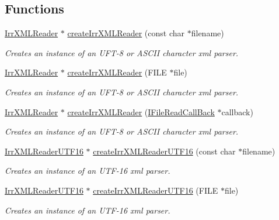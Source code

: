 \subsection*{Functions}
\begin{CompactItemize}
\item 
\hyperlink{classirr_1_1io_1_1_i_irr_x_m_l_reader}{IrrXMLReader} $\ast$ \hyperlink{namespaceirr_1_1io_a79dd5b9dae1b75be3dec4374176a5ce}{createIrrXMLReader} (const char $\ast$filename)
\begin{CompactList}\small\item\em Creates an instance of an UFT-8 or ASCII character xml parser. \item\end{CompactList}\item 
\hyperlink{classirr_1_1io_1_1_i_irr_x_m_l_reader}{IrrXMLReader} $\ast$ \hyperlink{namespaceirr_1_1io_64543772bdd123f8be1cdb20dac36353}{createIrrXMLReader} (FILE $\ast$file)
\begin{CompactList}\small\item\em Creates an instance of an UFT-8 or ASCII character xml parser. \item\end{CompactList}\item 
\hyperlink{classirr_1_1io_1_1_i_irr_x_m_l_reader}{IrrXMLReader} $\ast$ \hyperlink{namespaceirr_1_1io_70866610843a6fc753681de9a9076f4d}{createIrrXMLReader} (\hyperlink{classirr_1_1io_1_1_i_file_read_call_back}{IFileReadCallBack} $\ast$callback)
\begin{CompactList}\small\item\em Creates an instance of an UFT-8 or ASCII character xml parser. \item\end{CompactList}\item 
\hyperlink{classirr_1_1io_1_1_i_irr_x_m_l_reader}{IrrXMLReaderUTF16} $\ast$ \hyperlink{namespaceirr_1_1io_41c9d4c0d94702b3da2dca5799384443}{createIrrXMLReaderUTF16} (const char $\ast$filename)
\begin{CompactList}\small\item\em Creates an instance of an UTF-16 xml parser. \item\end{CompactList}\item 
\hyperlink{classirr_1_1io_1_1_i_irr_x_m_l_reader}{IrrXMLReaderUTF16} $\ast$ \hyperlink{namespaceirr_1_1io_4cc6190dd7eab54b7bff7219c550627f}{createIrrXMLReaderUTF16} (FILE $\ast$file)
\begin{CompactList}\small\item\em Creates an instance of an UTF-16 xml parser. \item\end{CompactList}\item 

\end{CompactItemize}

